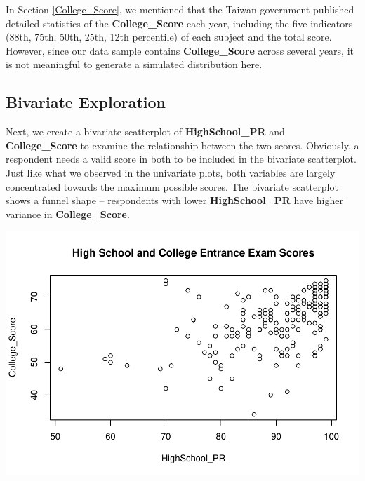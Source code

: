 \documentclass[
]{article}
\newenvironment{Shaded}{\begin{snugshade}}{\end{snugshade}}
\newcommand{\AttributeTok}[1]{\textcolor[rgb]{0.77,0.63,0.00}{#1}}
\newcommand{\FunctionTok}[1]{\textcolor[rgb]{0.00,0.00,0.00}{#1}}
\newcommand{\NormalTok}[1]{#1}
\newcommand{\SpecialCharTok}[1]{\textcolor[rgb]{0.00,0.00,0.00}{#1}}
\newcommand{\StringTok}[1]{\textcolor[rgb]{0.31,0.60,0.02}{#1}}
\begin{document}
In Section \ref{College_Score}, we mentioned that the Taiwan government
published detailed statistics of the \textbf{College\_Score} each year,
including the five indicators (88th, 75th, 50th, 25th, 12th percentile)
of each subject and the total score. However, since our data sample
contains \textbf{College\_Score} across several years, it is not
meaningful to generate a simulated distribution here.

\hypertarget{bivariate}{%
\subsection{Bivariate Exploration}\label{bivariate}}

Next, we create a bivariate scatterplot of \textbf{HighSchool\_PR} and
\textbf{College\_Score} to examine the relationship between the two
scores. Obviously, a respondent needs a valid score in both to be
included in the bivariate scatterplot. Just like what we observed in the
univariate plots, both variables are largely concentrated towards the
maximum possible scores. The bivariate scatterplot shows a funnel shape
-- respondents with lower \textbf{HighSchool\_PR} have higher variance
in \textbf{College\_Score}.

\begin{Shaded}
\end{Shaded}

\includegraphics{PTT_Analysis_of_Test_Scores_Unfinished_files/figure-latex/bivariate-1.pdf}
\end{document}
